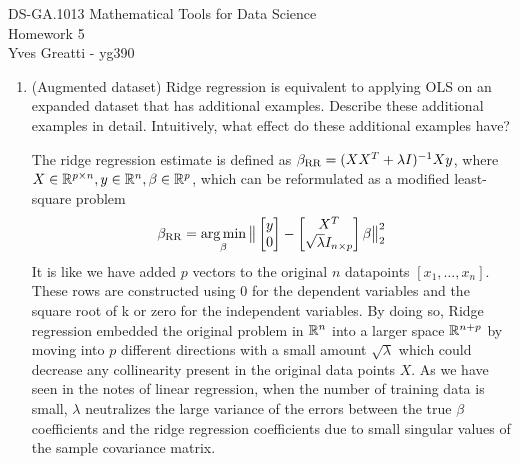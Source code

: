 \documentclass[12pt,twoside]{article}
\begin{document}
\noindent DS-GA.1013 Mathematical Tools for Data Science \\
Homework 5\\
Yves Greatti - yg390\\

\begin{enumerate}

\item (Augmented dataset) Ridge regression is equivalent to applying OLS on an expanded dataset that has additional examples. Describe these additional examples in detail. Intuitively, what effect do these additional examples have?\\
\medskip

The ridge regression estimate is defined as $\beta_{\operatorname{RR}} = (X X^T + \lambda I)^{-1} X y$, where $X \in \mathbb{R}^{p \times n}, y \in \mathbb{R}^n, \beta \in \mathbb{R}^p$, which can be reformulated as a modified least-square problem
$$\beta_{\operatorname{RR}} = \operatorname*{arg\,min}_\beta \big\| \begin{bmatrix} y   \\ 0 \end{bmatrix} - \begin{bmatrix} X^T   \\ \sqrt{\lambda} I_{n \times p} \end{bmatrix} \beta \big\|_2^2$$
It is like we have added $p$ vectors to the original $n$ datapoints $[x_1, \ldots, x_n]$. 
These rows are constructed using 0 for the dependent variables and the square root of k or zero for the independent variables.
By doing so, Ridge regression embedded the original problem in $\mathbb{R}^n$ into a larger space $\mathbb{R}^{n+p}$ by moving into $p$ different 
directions with a small amount $\sqrt{\lambda}$ which could decrease any collinearity present in the original data points $X$. 
 As we have seen in the notes of linear regression, when the number of training data is small, 
$\lambda$ neutralizes the large variance of the errors between the true  $\beta$ coefficients and the ridge regression coefficients due to small singular values  of the sample covariance matrix.
 
 \newpage
 

\end{enumerate}
\end{document}
